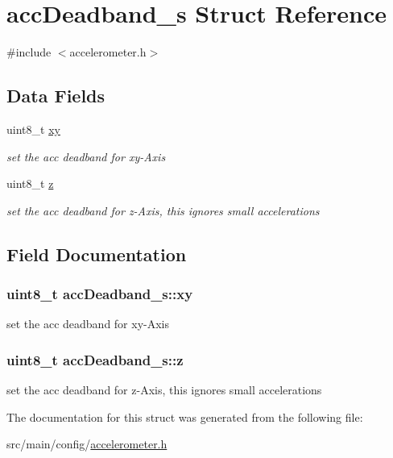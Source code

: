 \hypertarget{structaccDeadband__s}{\section{acc\+Deadband\+\_\+s Struct Reference}
\label{structaccDeadband__s}
}


{\ttfamily \#include $<$accelerometer.\+h$>$}

\subsection*{Data Fields}
\begin{DoxyCompactItemize}
\item 
uint8\+\_\+t \hyperlink{structaccDeadband__s_aa21047055fd90ef59fa182765c19b8b1}{xy}
\begin{DoxyCompactList}\small\item\em set the acc deadband for xy-\/\+Axis \end{DoxyCompactList}\item 
uint8\+\_\+t \hyperlink{structaccDeadband__s_abb2c223789187bb41776bd47f34110f7}{z}
\begin{DoxyCompactList}\small\item\em set the acc deadband for z-\/\+Axis, this ignores small accelerations \end{DoxyCompactList}\end{DoxyCompactItemize}


\subsection{Field Documentation}
\hypertarget{structaccDeadband__s_aa21047055fd90ef59fa182765c19b8b1}{
\subsubsection[{xy}]{\setlength{\rightskip}{0pt plus 5cm}uint8\+\_\+t acc\+Deadband\+\_\+s\+::xy}}\label{structaccDeadband__s_aa21047055fd90ef59fa182765c19b8b1}


set the acc deadband for xy-\/\+Axis 

\hypertarget{structaccDeadband__s_abb2c223789187bb41776bd47f34110f7}{
\subsubsection[{z}]{\setlength{\rightskip}{0pt plus 5cm}uint8\+\_\+t acc\+Deadband\+\_\+s\+::z}}\label{structaccDeadband__s_abb2c223789187bb41776bd47f34110f7}


set the acc deadband for z-\/\+Axis, this ignores small accelerations 



The documentation for this struct was generated from the following file\+:\begin{DoxyCompactItemize}
\item 
src/main/config/\hyperlink{accelerometer_8h}{accelerometer.\+h}\end{DoxyCompactItemize}

